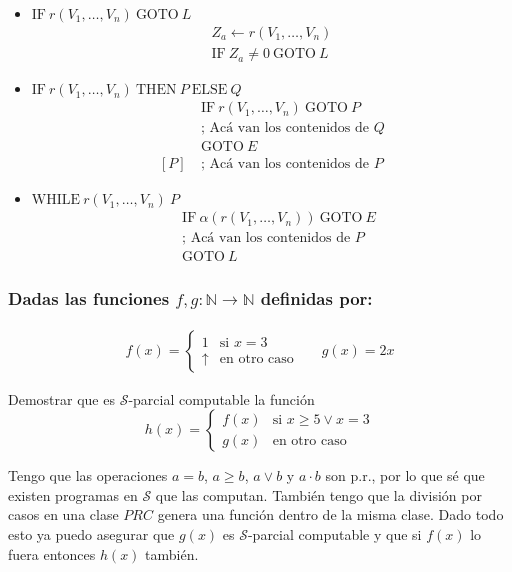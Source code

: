 \documentclass[fleqn, 11pt]{article}
\newcommand{\nat}{\mathbb{N}}
\newcommand{\Scur}{\mathcal{S}}
\newcommand{\indef}{\uparrow}
\newcommand{\into}{\leftarrow}
\newcommand{\IF}{\text{IF}}
\newcommand{\GOTO}{\text{GOTO}}
\newcommand{\WHILE}{\text{WHILE}}
\newcommand{\THEN}{\text{THEN}}
\newcommand{\ELSE}{\text{ELSE}}
\begin{document}
\begin{itemize}
	\item $\IF\ r(V_1, \dots, V_n)\ \GOTO\ L$
		\begin{gather*}
			Z_a \into r(V_1, \dots, V_n) \\
			\IF\ Z_a \neq 0\ \GOTO\ L
		\end{gather*}
	\item $\IF\ r(V_1, \dots, V_n)\ \THEN\ P\ \ELSE\ Q$
		\begin{align*}
			     &\IF\ r(V_1, \dots, V_n)\ \GOTO\ P \\
			     &\text{; Acá van los contenidos de }Q \\
			     &\GOTO\ E \\
			[P]\ &\text{; Acá van los contenidos de }P
		\end{align*}
	\item $\WHILE\ r(V_1, \dots, V_n)\ P$
		\begin{align*}
			[L]\ &\IF\ \alpha(r(V_1, \dots, V_n))\ \GOTO\ E \\
			     &\text{; Acá van los contenidos de }P \\
			     &\GOTO\ L
		\end{align*}
\end{itemize}

\subsubsection{Dadas las funciones $f, g : \nat \to \nat$ definidas por:}

\begin{align*}
	f(x) =
	\begin{cases}
		1      & \text{si } x = 3 \\
		\indef & \text{en otro caso}
	\end{cases}  && g(x) = 2x
\end{align*}

Demostrar que es $\Scur$-parcial computable la función
\[
	h(x) = 
	\begin{cases}
		f(x) & \text{si } x \geq 5 \lor x = 3 \\
		g(x) & \text{en otro caso}
	\end{cases}
\]

Tengo que las operaciones $a = b$, $a \geq b$, $a \lor b$ y $a \cdot b$ son
p.r., por lo que sé que existen programas en $\Scur$ que las computan. También
tengo que la división por casos en una clase $PRC$ genera una función dentro de
la misma clase. Dado todo esto ya puedo asegurar que $g(x)$ es $\Scur$-parcial
computable y que si $f(x)$ lo fuera entonces $h(x)$ también.
\end{document}
